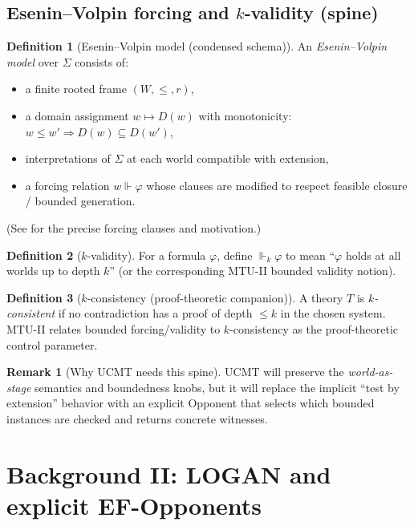 \documentclass[11pt]{article}
\theoremstyle{definition}
\newtheorem{definition}{Definition}[section]
\newtheorem{remark}{Remark}[section]
\theoremstyle{plain}
\newcommand{\Sig}{\Sigma}
\newcommand{\Thy}{T}
\newcommand{\forces}{\Vdash}              %
\newcommand{\kforces}{\Vdash_k}           %
\begin{document}
\subsection{Esenin--Volpin forcing and $k$-validity (spine)}

\begin{definition}[Esenin--Volpin model (condensed schema)]
An \emph{Esenin--Volpin model} over $\Sig$ consists of:
\begin{itemize}[leftmargin=1.5em]
\item a finite rooted frame $(W,\le,r)$,
\item a domain assignment $w\mapsto D(w)$ with monotonicity: $w\le w'\Rightarrow D(w)\subseteq D(w')$,
\item interpretations of $\Sig$ at each world compatible with extension,
\item a forcing relation $w\forces \varphi$ whose clauses are modified to respect feasible closure / bounded generation.
\end{itemize}
(See \cite{Mannucci2023MTU2} for the precise forcing clauses and motivation.)
\end{definition}

\begin{definition}[$k$-validity]
For a formula $\varphi$, define $\kforces \varphi$ to mean ``$\varphi$ holds at all worlds up to depth $k$''
(or the corresponding MTU-II bounded validity notion).
\end{definition}

\begin{definition}[$k$-consistency (proof-theoretic companion)]
A theory $\Thy$ is \emph{$k$-consistent} if no contradiction has a proof of depth $\le k$ in the chosen system.
MTU-II relates bounded forcing/validity to $k$-consistency as the proof-theoretic control parameter.
\end{definition}

\begin{remark}[Why UCMT needs this spine]
UCMT will preserve the \emph{world-as-stage} semantics and boundedness knobs, but it will replace the implicit
``test by extension'' behavior with an explicit Opponent that selects which bounded instances are checked and
returns concrete witnesses.
\end{remark}

\section{Background II: LOGAN and explicit EF-Opponents}
\end{document}
